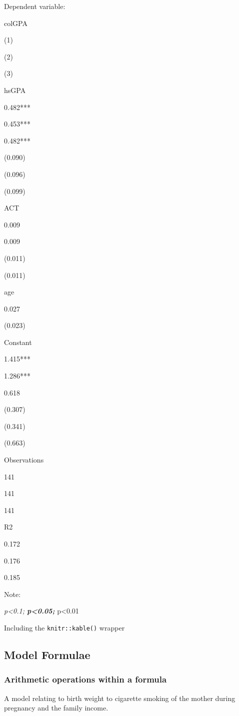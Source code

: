 \documentclass[]{book}
\begin{document}
Dependent variable:

colGPA

(1)

(2)

(3)

hsGPA

0.482***

0.453***

0.482***

(0.090)

(0.096)

(0.099)

ACT

0.009

0.009

(0.011)

(0.011)

age

0.027

(0.023)

Constant

1.415***

1.286***

0.618

(0.307)

(0.341)

(0.663)

Observations

141

141

141

R2

0.172

0.176

0.185

Note:

\emph{p\textless0.1; \textbf{p\textless0.05; }}p\textless0.01

Including the \texttt{knitr::kable()} wrapper

\hypertarget{model-formulae}{%
\subsection{Model Formulae}\label{model-formulae}}

\hypertarget{arithmetic-operations-within-a-formula}{%
\subsubsection{Arithmetic operations within a formula}\label{arithmetic-operations-within-a-formula}}

A model relating to birth weight to cigarette smoking of the mother during pregnancy and the family income.
\end{document}
